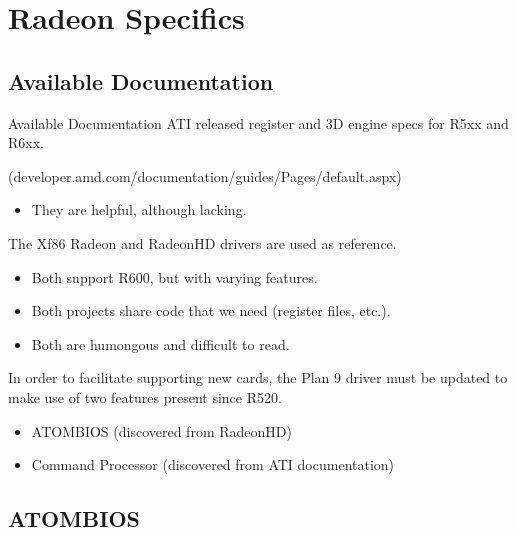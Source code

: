 \documentclass[xcolor=dvipsnames]{beamer}
\begin{document}
\section{Radeon Specifics}

\subsection{Available Documentation}

\begin{frame}[t]{Available Documentation}
	ATI released register and 3D engine specs for R5xx and R6xx.

	(developer.amd.com/documentation/guides/Pages/default.aspx)

	\begin{itemize}
		\item They are helpful, although lacking.
	\end{itemize}

	\pause
	The Xf86 Radeon and RadeonHD drivers are used as reference.
	\begin{itemize}
		\item Both support R600, but with varying features.
		\item Both projects share code that we need (register files, etc.).
		\item Both are humongous and difficult to read.
	\end{itemize}

	\pause
	In order to facilitate supporting new cards, the Plan 9 driver must be updated to make use of two features present since R520.
\begin{itemize}
		\item ATOMBIOS (discovered from RadeonHD)
		\item Command Processor (discovered from ATI documentation)
	\end{itemize}
\end{frame}


\subsection{ATOMBIOS}
\end{document}
